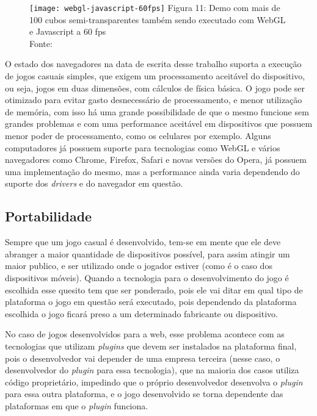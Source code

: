 \begin{figure}[H]
  \centering
	\texttt{[image: webgl-javascript-60fps]}
	\footnotesize\hspace{8\baselineskip}
	Figura 11: Demo com mais de 100 cubos semi-transparentes
	também sendo executado com WebGL e Javascript a 60 fps \\
	Fonte: \cite{website:webglperformance}
  \label{img:webgl-javascript-60fps}
\end{figure}

O estado dos navegadores na data de escrita desse
trabalho suporta a execução de jogos casuais simples, que exigem
um processamento aceitável do dispositivo, ou seja, jogos em duas
dimensões, com cálculos de física básica. O jogo pode ser otimizado
para evitar gasto desnecessário de processamento, e menor utilização
de memória, com isso há uma grande possibilidade de que o mesmo
funcione sem grandes problemas e com uma performance aceitável em dispositivos
que possuem menor poder de processamento, como os celulares por exemplo.
Alguns computadores já possuem suporte para tecnologias como WebGL e
vários navegadores como Chrome, Firefox, Safari e novas versões do
Opera, já possuem uma implementação do mesmo, mas a performance ainda
varia dependendo do suporte dos \textit{drivers} e do navegador em
questão.

\subsection{Portabilidade}

Sempre que um jogo casual é desenvolvido, tem-se em mente que ele deve
abranger a maior quantidade de dispositivos possível, para assim
atingir um maior publico, e ser utilizado onde o jogador estiver (como
é o caso dos dispositivos móveis). Quando a tecnologia para o
desenvolvimento do jogo é escolhida esse quesito tem que ser
ponderado, pois ele vai ditar em qual tipo de plataforma o jogo em
questão será executado, pois dependendo da plataforma escolhida o jogo ficará preso
a um determinado fabricante ou dispositivo.

No caso de jogos desenvolvidos para a web, esse problema acontece com as
tecnologias que utilizam \textit{plugins} que devem ser instalados na
plataforma final, pois o desenvolvedor vai depender de uma empresa
terceira (nesse caso, o desenvolvedor do \textit{plugin} para essa tecnologia),
que na maioria dos casos utiliza código proprietário, impedindo que o
próprio desenvolvedor desenvolva o \textit{plugin} para essa outra plataforma,
e o jogo desenvolvido se torna dependente das plataformas em que o
\textit{plugin}
funciona.

